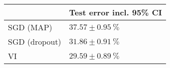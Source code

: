 \begin{tabular}{ll}
\toprule
{} & Test error incl. 95\% CI \\
\midrule
SGD (MAP)     &      $37.57 \pm 0.95~\%$ \\
SGD (dropout) &      $31.86 \pm 0.91~\%$ \\
VI            &      $29.59 \pm 0.89~\%$ \\
\bottomrule
\end{tabular}
